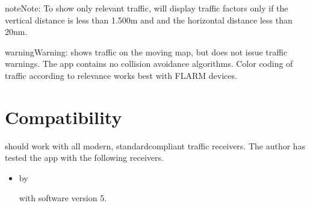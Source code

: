 \documentclass[letterpaper,10pt,english]{sphinxmanual}
\begin{document}
\begin{sphinxadmonition}{note}{Note:}
\sphinxAtStartPar
To show only relevant traffic,  will
display traffic factors only if the vertical distance is less than 1.500m
and and the horizontal distance less than 20nm.
\end{sphinxadmonition}

\begin{sphinxadmonition}{warning}{Warning:}
\sphinxAtStartPar
{} shows traffic on the moving map, but
does not issue traffic warnings.  The app contains no collision avoidance
algorithms.  Color coding of traffic according to relevance works best with
FLARM devices.
\end{sphinxadmonition}


\section{Compatibility}
\label{\detokenize{02-steps/traffic:compatibility}}
\sphinxAtStartPar
{} should work with all modern, standard\sphinxhyphen{}compliant
traffic receivers.  The author has tested the app with the following receivers.
\begin{itemize}
\item {} 
\sphinxAtStartPar
{}%
\begin{footnote}[9]\sphinxAtStartFootnote
{}
%
\end{footnote} by %
\begin{footnote}[10]\sphinxAtStartFootnote
{}
%
\end{footnote} with software version 5.

\end{itemize}
\end{document}
